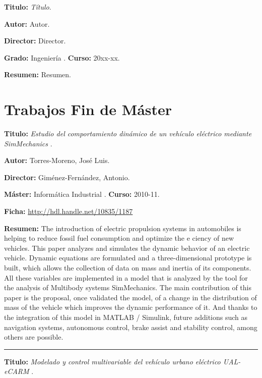  \textbf{Titulo:} \textit{Título}. %

\textbf{Autor:} Autor.

\textbf{Director:} Director.

\textbf{Grado:} Ingeniería . \textbf{Curso:} 20xx-xx. 

 
\textbf{Resumen:} Resumen.
 
\section{Trabajos Fin de Máster}
\textbf{Titulo:} \textit{Estudio del comportamiento dinámico de un vehículo eléctrico mediante SimMechanics} \cite{torres2011UALeCARM}.

\textbf{Autor:} Torres-Moreno, José Luis.

\textbf{Director:} Giménez-Fernández, Antonio.

\textbf{Máster:} Informática Industrial . \textbf{Curso:} 2010-11. 

\textbf{Ficha:} \url{http://hdl.handle.net/10835/1187}
 
\textbf{Resumen:} The introduction of electric propulsion systems in automobiles is helping to reduce fossil fuel consumption and optimize the e ciency of new vehicles. This paper analyzes and simulates the dynamic behavior of an electric vehicle. Dynamic equations are formulated and a three-dimensional prototype is built, which allows the collection of data on mass and inertia of its components. All these variables are implemented in a model that is analyzed by the tool for the analysis of Multibody systems SimMechanics. The main contribution of this paper is the proposal, once validated the model, of a change in the distribution of mass of the vehicle which improves the dynamic performance of it. And thanks to the integration of this model in MATLAB / Simulink, future additions such as navigation systems, autonomous control, brake assist and stability control, among others are possible.
 
\vspace{6pt} \hrule \vspace{6pt}

\textbf{Titulo:} \textit{Modelado y control multivariable del vehículo urbano eléctrico UAL-eCARM} \cite{manas2019UALeCARM}.

